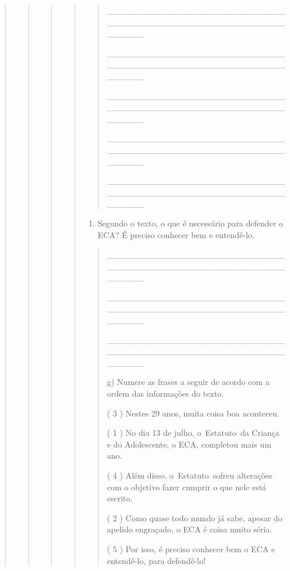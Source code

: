\begin{quote}
\begin{quote}
\begin{quote}
\begin{quote}
\begin{quote}
\_\_\_\_\_\_\_\_\_\_\_\_\_\_\_\_\_\_\_\_\_\_\_\_\_\_\_\_\_\_\_\_\_\_\_\_\_\_\_\_\_\_\_\_\_\_\_\_\_\_\_\_\_\_\_\_\_\_\_\_\_\_\_\_

\_\_\_\_\_\_\_\_\_\_\_\_\_\_\_\_\_\_\_\_\_\_\_\_\_\_\_\_\_\_\_\_\_\_\_\_\_\_\_\_\_\_\_\_\_\_\_\_\_\_\_\_\_\_\_\_\_\_\_\_\_\_\_\_

\protect\hypertarget{_Hlk128040463}{}{}\_\_\_\_\_\_\_\_\_\_\_\_\_\_\_\_\_\_\_\_\_\_\_\_\_\_\_\_\_\_\_\_\_\_\_\_\_\_\_\_\_\_\_\_\_\_\_\_\_\_\_\_\_\_\_\_\_\_\_\_\_\_\_\_

\_\_\_\_\_\_\_\_\_\_\_\_\_\_\_\_\_\_\_\_\_\_\_\_\_\_\_\_\_\_\_\_\_\_\_\_\_\_\_\_\_\_\_\_\_\_\_\_\_\_\_\_\_\_\_\_\_\_\_\_\_\_\_\_

\_\_\_\_\_\_\_\_\_\_\_\_\_\_\_\_\_\_\_\_\_\_\_\_\_\_\_\_\_\_\_\_\_\_\_\_\_\_\_\_\_\_\_\_\_\_\_\_\_\_\_\_\_\_\_\_\_\_\_\_\_\_\_\_
\end{quote}

\begin{enumerate}
\def\labelenumi{\alph{enumi})}
\item
  Segundo o texto, o que é necessário para defender o ECA? É preciso
  conhecer bem e entendê-lo.
\end{enumerate}

\begin{quote}
\_\_\_\_\_\_\_\_\_\_\_\_\_\_\_\_\_\_\_\_\_\_\_\_\_\_\_\_\_\_\_\_\_\_\_\_\_\_\_\_\_\_\_\_\_\_\_\_\_\_\_\_\_\_\_\_\_\_\_\_\_\_\_\_

\_\_\_\_\_\_\_\_\_\_\_\_\_\_\_\_\_\_\_\_\_\_\_\_\_\_\_\_\_\_\_\_\_\_\_\_\_\_\_\_\_\_\_\_\_\_\_\_\_\_\_\_\_\_\_\_\_\_\_\_\_\_\_\_

\_\_\_\_\_\_\_\_\_\_\_\_\_\_\_\_\_\_\_\_\_\_\_\_\_\_\_\_\_\_\_\_\_\_\_\_\_\_\_\_\_\_\_\_\_\_\_\_\_\_\_\_\_\_\_\_\_\_\_\_\_\_\_\_

g) Numere as frases a seguir de acordo com a ordem das informações do
texto.

( 3 ) Nestes 29 anos, muita coisa boa aconteceu.

( 1 ) No dia 13 de julho, o~Estatuto~da Criança e do Adolescente, o ECA,
completou mais um ano.

( 4 ) Além disso, o~Estatuto~sofreu alterações com o objetivo fazer
cumprir o que nele está escrito.

( 2 ) Como quase todo mundo já sabe, apesar do apelido engraçado, o ECA
é coisa muito séria.

( 5 ) Por isso, é preciso conhecer bem o ECA e entendê-lo, para
defendê-lo!
\end{quote}


\end{quote}
\end{quote}
\end{quote}
\end{quote}

